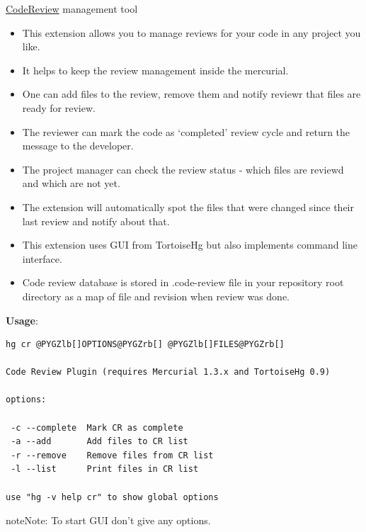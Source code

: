 \documentclass[letterpaper,10pt,english]{manual}
\begin{document}
\href{http://bitbucket.org/glimchb/hgcr-gui/wiki/Home}{CodeReview} management tool
\begin{itemize}
\item {} 
This extension allows you to manage reviews for your code in any project you like.

\item {} 
It helps to keep the review management inside the mercurial.

\item {} 
One can add files to the review, remove them and notify reviewr that files are ready for review.

\item {} 
The reviewer can mark the code as `completed' review cycle and return the message to the developer.

\item {} 
The project manager can check the review status - which files are reviewd and which are not yet.

\item {} 
The extension will automatically spot the files that were changed since their last review and notify about that.

\item {} 
This extension uses GUI from TortoiseHg but also implements command line interface.

\item {} 
Code review database is stored in .code-review file in your repository root directory as a map of file and revision when review was done.

\end{itemize}

\textbf{Usage}:

\begin{Verbatim}[commandchars=@\[\]]
hg cr @PYGZlb[]OPTIONS@PYGZrb[] @PYGZlb[]FILES@PYGZrb[]

Code Review Plugin (requires Mercurial 1.3.x and TortoiseHg 0.9)

options:

 -c --complete  Mark CR as complete
 -a --add       Add files to CR list
 -r --remove    Remove files from CR list
 -l --list      Print files in CR list

use "hg -v help cr" to show global options
\end{Verbatim}

\begin{notice}{note}{Note:}
To start GUI don't give any options.
\end{notice}
\end{document}

